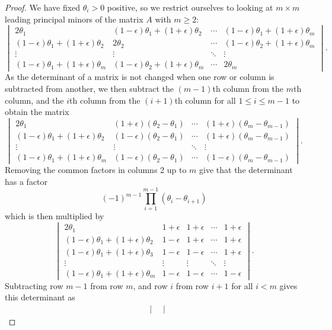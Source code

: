 \begin{proof}
We have fixed $\theta_i>0$ positive, so we restrict ourselves to looking at $m\times m$ leading principal minors of the matrix $A$ with $m\geq2$:
\[
 \begin{vmatrix}
2\theta_1 & (1-\epsilon)\theta_1+(1+\epsilon)\theta_2 & \cdots & (1-\epsilon)\theta_1+(1+\epsilon)\theta_m \\
(1-\epsilon)\theta_1+(1+\epsilon)\theta_2 & 2\theta_2 &\cdots & (1-\epsilon)\theta_2+(1+\epsilon)\theta_m \\
\vdots&\vdots&\ddots&\vdots \\
(1-\epsilon)\theta_1+(1+\epsilon)\theta_m & (1-\epsilon)\theta_2+(1+\epsilon)\theta_m &\cdots & 2\theta_m \end{vmatrix}. 
\]
As the determinant of a matrix is not changed when one row or column is subtracted from another, we then subtract the $(m-1)$th column from the $m$th column, and the $i$th column from the $(i+1)$th column for all $1\leq i\leq m-1$ to obtain the matrix
\[
 \begin{vmatrix}
2\theta_1 &(1+\epsilon)(\theta_2-\theta_1) & \cdots &(1+\epsilon)(\theta_m-\theta_{m-1}) \\
(1-\epsilon)\theta_1+(1+\epsilon)\theta_2 & (1-\epsilon)(\theta_2-\theta_1) &\cdots & (1+\epsilon)(\theta_m-\theta_{m-1}) \\
\vdots&\vdots&\ddots&\vdots \\
(1-\epsilon)\theta_1+(1+\epsilon)\theta_m & (1-\epsilon)(\theta_2-\theta_1) &\cdots & (1-\epsilon)(\theta_m-\theta_{m-1}) \end{vmatrix}. 
\]
Removing the common factors in columns 2 up to $m$ give that the determinant has a factor
\[
(-1)^{m-1}\prod_{i=1}^{m-1}(\theta_i-\theta_{i+1})
\]
which is then multiplied by
\[
\begin{vmatrix}
2\theta_1 & 1+\epsilon & 1+\epsilon & \cdots & 1+\epsilon \\
(1-\epsilon)\theta_1+(1+\epsilon)\theta_2&1-\epsilon&1+\epsilon&\cdots&1+\epsilon \\
(1-\epsilon)\theta_1+(1+\epsilon)\theta_3&1-\epsilon&1-\epsilon&\cdots&1+\epsilon \\
\vdots&\vdots&\vdots&\ddots&\vdots \\
(1-\epsilon)\theta_1+(1+\epsilon)\theta_m&1-\epsilon&1-\epsilon&\cdots&1-\epsilon \end{vmatrix}.
\]
Subtracting row $m-1$ from row $m$, and row $i$ from row $i+1$ for all $i<m$ gives this determinant as
\begin{align}
&\begin{vmatrix}

\end{vmatrix}
\end{align}
\end{proof}
